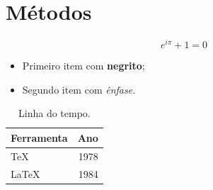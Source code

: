 \section{Métodos}
\label{sec:methods}

\begin{equation}
  e^{i\pi} + 1 = 0
  \label{eq:euler}
\end{equation}

\begin{itemize}
  \item Primeiro item com \textbf{negrito};
  \item Segundo item com \emph{ênfase}.
\end{itemize}

\begin{table}[ht]
  \centering
  \begin{tabular}{lr}
    \hline
    Ferramenta & Ano \\
    \hline
    \TeX & 1978 \\
    \LaTeX & 1984 \\
    \hline
  \end{tabular}
  \caption{Linha do tempo.}
  \label{tab:timeline}
\end{table}

